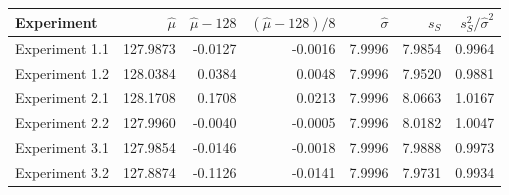 \begin{tabular}{lrrrrrr}
\hline
Experiment & $\hat\mu$ & $\hat\mu-128$ & $(\hat\mu-128)/8$ & $\hat\sigma$ & $s_S$ & $s_S^2/\hat\sigma^2$ \\
\hline
Experiment 1.1 & 127.9873 & -0.0127 & -0.0016 & 7.9996 & 7.9854 & 0.9964 \\
Experiment 1.2 & 128.0384 & 0.0384 & 0.0048 & 7.9996 & 7.9520 & 0.9881 \\
Experiment 2.1 & 128.1708 & 0.1708 & 0.0213 & 7.9996 & 8.0663 & 1.0167 \\
Experiment 2.2 & 127.9960 & -0.0040 & -0.0005 & 7.9996 & 8.0182 & 1.0047 \\
Experiment 3.1 & 127.9854 & -0.0146 & -0.0018 & 7.9996 & 7.9888 & 0.9973 \\
Experiment 3.2 & 127.8874 & -0.1126 & -0.0141 & 7.9996 & 7.9731 & 0.9934 \\
\hline
\end{tabular}
